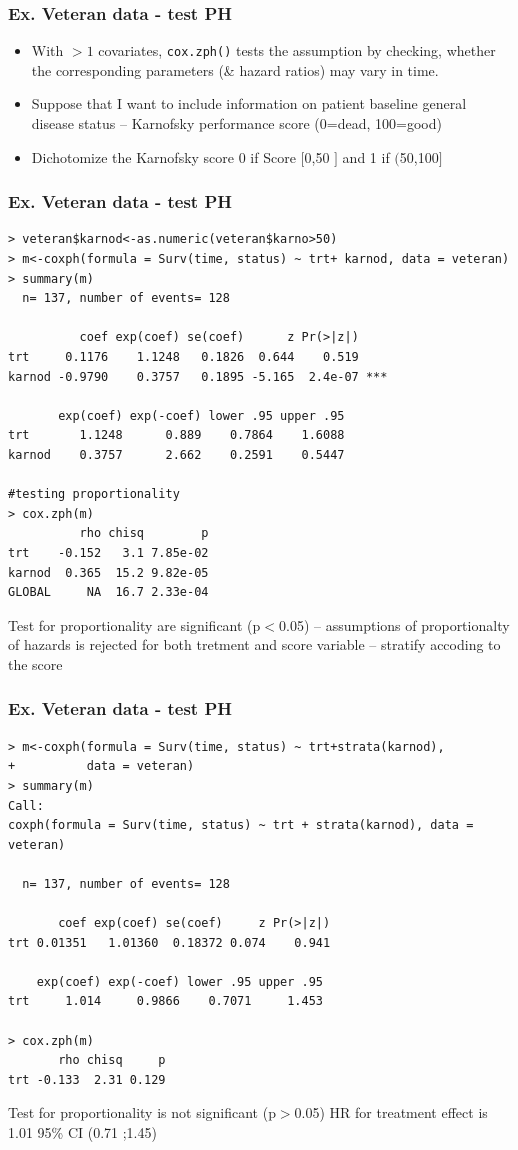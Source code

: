 \documentclass[12pt]{beamer}
\begin{document}
\begin{frame}[fragile] 
\frametitle{Ex. Veteran data - test PH}
\begin{itemize}
\item With $>1$ covariates,  \texttt{cox.zph()} tests the assumption by checking, whether the corresponding parameters (\& hazard ratios)
may vary in time.

\item Suppose that I want to include information on patient baseline general disease status -- Karnofsky performance score (0=dead, 100=good)

\item Dichotomize the Karnofsky score 0 if Score $[$0,50 $]$ and 1 if $($50,100$]$
\end{itemize}
\end{frame}

\begin{frame}[fragile] 
\frametitle{Ex. Veteran data - test PH}
{\scriptsize 
\begin{verbatim}
> veteran$karnod<-as.numeric(veteran$karno>50)
> m<-coxph(formula = Surv(time, status) ~ trt+ karnod, data = veteran)
> summary(m)
  n= 137, number of events= 128 

          coef exp(coef) se(coef)      z Pr(>|z|)    
trt     0.1176    1.1248   0.1826  0.644    0.519    
karnod -0.9790    0.3757   0.1895 -5.165  2.4e-07 ***

       exp(coef) exp(-coef) lower .95 upper .95
trt       1.1248      0.889    0.7864    1.6088
karnod    0.3757      2.662    0.2591    0.5447

#testing proportionality
> cox.zph(m)
          rho chisq        p
trt    -0.152   3.1 7.85e-02
karnod  0.365  15.2 9.82e-05
GLOBAL     NA  16.7 2.33e-04
\end{verbatim}
}
Test for proportionality are significant (p$<$0.05) -- assumptions of proportionalty of hazards is rejected for both tretment and score variable
-- stratify accoding to the score 
\end{frame}

\begin{frame}[fragile] 
\frametitle{Ex. Veteran data - test PH}
{\scriptsize 
\begin{verbatim}
> m<-coxph(formula = Surv(time, status) ~ trt+strata(karnod), 
+          data = veteran)
> summary(m)
Call:
coxph(formula = Surv(time, status) ~ trt + strata(karnod), data = veteran)

  n= 137, number of events= 128 

       coef exp(coef) se(coef)     z Pr(>|z|)
trt 0.01351   1.01360  0.18372 0.074    0.941

    exp(coef) exp(-coef) lower .95 upper .95
trt     1.014     0.9866    0.7071     1.453

> cox.zph(m)
       rho chisq     p
trt -0.133  2.31 0.129
\end{verbatim}
}
Test for proportionality is not significant (p$>$0.05) \newline
HR for treatment effect is 1.01 95\% CI (0.71 ;1.45)
\end{frame}
\end{document}
